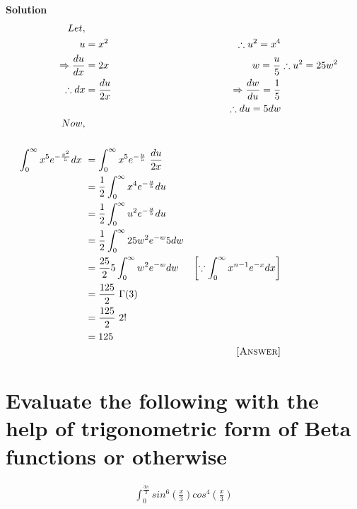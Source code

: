 \documentclass[12pt]{article}
\begin{document}
\textbf{Solution}
\begin{align*}
    Let,\\ u&=x^2 & \therefore u^2=x^4\\
    \Rightarrow\frac{du}{dx}&=2x & w=\frac{u}{5} & \therefore u^2=25w^2\\
    \therefore dx&=\frac{du}{2x} & \Rightarrow\frac{dw}{du}=\frac{1}{5}\\
    & & \therefore du=5dw\\
    Now,\\\\ \int_{0}^{\infty}{x^5}{e^{-\frac{x^2}{5}}}dx\ &=\int_{0}^{\infty}{x^5}{e^{-\frac{u}{5}}}\ \frac{du}{2x}\\
    &=\frac{1}{2}\int_{0}^{\infty}{x^4}{e^{-\frac{u}{5}}}du\\
    &=\frac{1}{2}\int_{0}^{\infty}{u^2}{e^{-\frac{u}{5}}}du\\
    &=\frac{1}{2}\int_{0}^{\infty}{25w^2}{e^{-w}}5dw\\
    &=\frac{25}{2}5\int_{0}^{\infty}{w^2}{e^{-w}}dw & \left[\because \int_{0}^{\infty}{x^{n-1}}{e^{-x}}dx\right]\\
    &=\frac{125}{2}\ \Gamma(3)\\
    &=\frac{125}{2}\ 2!\\
    &=125\\
    & & \textsc{[Answer]}
\end{align*}
\pagebreak


\section{Evaluate the following with the help of trigonometric form of Beta functions or otherwise}


\begin{align*}
    \int_{0}^{\frac{3\pi}{2}}{sin^6\left(\frac{x}{3}\right)}{cos^4\left(\frac{x}{3}\right)}
\end{align*}
\end{document}
